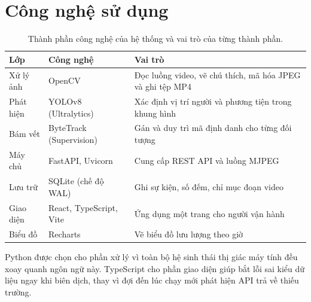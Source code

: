 \section{Công nghệ sử dụng}
\label{sec:congnghe}

\begin{table}[H]
\centering
\caption{Thành phần công nghệ của hệ thống và vai trò của từng thành phần.}
\label{tab:congnghe}
\small
\begin{tabularx}{\textwidth}{@{}llX@{}}
\toprule
\textbf{Lớp} & \textbf{Công nghệ} & \textbf{Vai trò} \\
\midrule
Xử lý ảnh    & OpenCV            & Đọc luồng video, vẽ chú thích, mã hóa JPEG và ghi tệp MP4 \\
Phát hiện    & YOLOv8 (Ultralytics) & Xác định vị trí người và phương tiện trong khung hình \\
Bám vết      & ByteTrack (Supervision) & Gán và duy trì mã định danh cho từng đối tượng \\
Máy chủ      & FastAPI, Uvicorn  & Cung cấp REST API và luồng MJPEG \\
Lưu trữ      & SQLite (chế độ WAL) & Ghi sự kiện, số đếm, chỉ mục đoạn video \\
Giao diện    & React, TypeScript, Vite & Ứng dụng một trang cho người vận hành \\
Biểu đồ      & Recharts          & Vẽ biểu đồ lưu lượng theo giờ \\
\bottomrule
\end{tabularx}
\end{table}

Python được chọn cho phần xử lý vì toàn bộ hệ sinh thái thị giác máy tính đều
xoay quanh ngôn ngữ này. TypeScript cho phần giao diện giúp bắt lỗi sai kiểu dữ
liệu ngay khi biên dịch, thay vì đợi đến lúc chạy mới phát hiện API trả về thiếu
trường.
